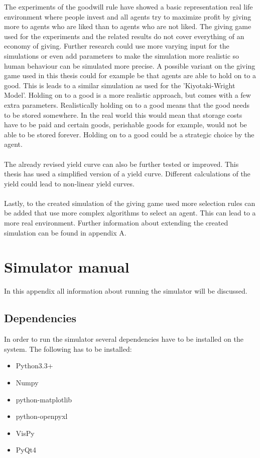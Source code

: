\documentclass[twoside,openright]{uva-bachelor-thesis}
\begin{document}
The experiments of the goodwill rule have showed a basic representation real life environment where people invest and all agents try to maximize profit by giving more to agents who are liked than to agents who are not liked. The giving game used for the experiments and the related results do not cover everything of an economy of giving. Further research could use more varying input for the simulations or even add parameters to make the simulation more realistic so human behaviour can be simulated more precise. A possible variant on the giving game used in this thesis could for example be that agents are able to hold on to a good. This is leads to a similar simulation as used for the 'Kiyotaki-Wright Model'\cite{moranmoney}. Holding on to a good is a more realistic approach, but comes with a few extra parameters. Realistically holding on to a good means that the good needs to be stored somewhere. In the real world this would mean that storage costs have to be paid and certain goods, perishable goods for example, would not be able to be stored forever. Holding on to a good could be a strategic choice by the agent.
\\
\\
The already revised yield curve can also be further tested or improved. This thesis has used a simplified version of a yield curve. Different calculations of the yield could lead to non-linear yield curves. \\
\\
Lastly, to the created simulation of the giving game used more selection rules can be added that use more complex algorithms to select an agent. This can lead to a more real environment. Further information about extending the created simulation can be found in appendix A.





\appendix
\chapter{Simulator manual}
In this appendix all information about running the simulator will be discussed.

\section{Dependencies}
In order to run the simulator several dependencies have to be installed on the system. The following has to be installed:
\begin{itemize}
\item Python3.3+
\item Numpy
\item python-matplotlib
\item python-openpyxl
\item VisPy
\item PyQt4
\end{itemize}
\end{document}
